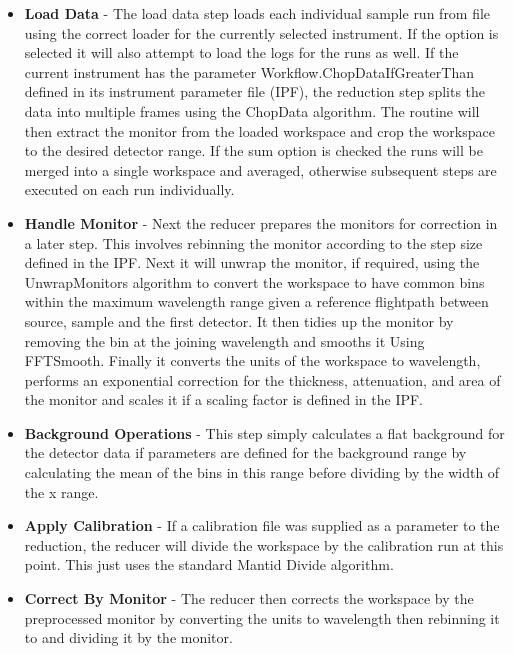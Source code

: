 \documentclass[paper=a4, fontsize=11pt]{scrartcl}	%
\numberwithin{equation}{section}															%
\numberwithin{figure}{section}																%
\numberwithin{table}{section}																%
\begin{document}
\begin{itemize}
\item \textbf{Load Data} - The load data step loads each individual sample run from file using the correct loader for the currently selected instrument. If the option is selected it will also attempt to load the logs for the runs as well. If the current instrument has the parameter Workflow.ChopDataIfGreaterThan defined  in its instrument parameter file (IPF), the reduction step splits the data into multiple frames using the ChopData algorithm. The routine will then extract the monitor from the loaded workspace and crop the workspace to the desired detector range. If the sum option is checked the runs will be merged into a single workspace and averaged, otherwise subsequent steps are executed on each run individually.

\item \textbf{Handle Monitor} - Next the reducer prepares the monitors for correction in a later step. This involves rebinning the monitor according to the step size defined in the IPF. Next it will unwrap the monitor, if required, using the UnwrapMonitors algorithm to convert the workspace to have common bins within the maximum wavelength range given a reference flightpath between source, sample and the first detector. It then tidies up the monitor by removing the bin at the joining wavelength and smooths it Using FFTSmooth. Finally it converts the units of the workspace to wavelength, performs an exponential correction for the thickness, attenuation, and area of the monitor and scales it if a scaling factor is defined in the IPF.

\item \textbf{Background Operations} - This step simply calculates a flat background for the detector data if parameters are defined for the background range by calculating the mean of the bins in this range before dividing by the width of the x range.

\item \textbf{Apply Calibration} - If a calibration file was supplied as a parameter to the reduction, the reducer will divide the workspace by the calibration run at this point. This just uses the standard Mantid Divide algorithm.

\item \textbf{Correct By Monitor} - The reducer then corrects the workspace by the preprocessed monitor by converting the units to wavelength then rebinning it to and dividing it by the monitor.


\end{itemize}
\end{document}
